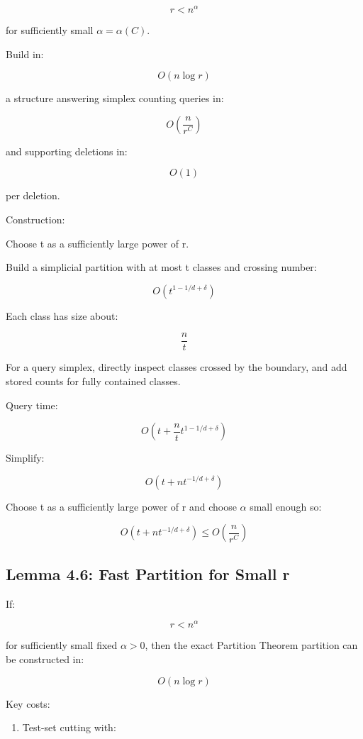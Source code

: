 \documentclass[
  11pt,
]{article}
\providecommand{\tightlist}{%
  \setlength{\itemsep}{0pt}\setlength{\parskip}{0pt}}
\begin{document}
\[
r< n^\alpha
\]

for sufficiently small \(\alpha=\alpha(C)\).

Build in:

\[
O(n\log r)
\]

a structure answering simplex counting queries in:

\[
O\left(\frac{n}{r^C}\right)
\]

and supporting deletions in:

\[
O(1)
\]

per deletion.

Construction:

Choose t as a sufficiently large power of r.

Build a simplicial partition with at most t classes and crossing number:

\[
O(t^{1-1/d+\delta})
\]

Each class has size about:

\[
\frac{n}{t}
\]

For a query simplex, directly inspect classes crossed by the boundary,
and add stored counts for fully contained classes.

Query time:

\[
O\left(t+\frac{n}{t}t^{1-1/d+\delta}\right)
\]

Simplify:

\[
O\left(t+n t^{-1/d+\delta}\right)
\]

Choose t as a sufficiently large power of r and choose \(\alpha\) small
enough so:

\[
O\left(t+n t^{-1/d+\delta}\right) \le O\left(\frac{n}{r^C}\right)
\]

\hypertarget{lemma-4.6-fast-partition-for-small-r}{%
\subsection{Lemma 4.6: Fast Partition for Small
r}\label{lemma-4.6-fast-partition-for-small-r}}

If:

\[
r< n^\alpha
\]

for sufficiently small fixed \(\alpha>0\), then the exact Partition
Theorem partition can be constructed in:

\[
O(n\log r)
\]

Key costs:

\begin{enumerate}
\def\labelenumi{\arabic{enumi}.}
\tightlist
\item
  Test-set cutting with:
\end{enumerate}
\end{document}

